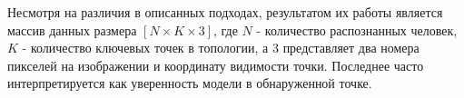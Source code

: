 Несмотря на различия в описанных подходах, результатом их работы является массив данных размера $[N \times K \times 3]$, где $N$ - количество распознанных человек, $K$ - количество ключевых точек в топологии, а 3 представляет два номера пикселей на изображении и координату видимости точки. Последнее часто интерпретируется как уверенность модели в обнаруженной точке.

\newpage